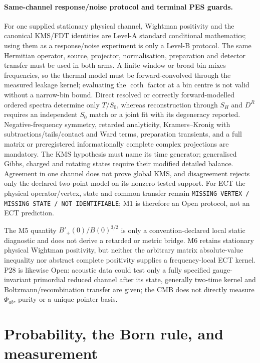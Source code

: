 \documentclass[11pt,a4paper]{article}
\begin{document}
\paragraph{Same-channel response/noise protocol and terminal PES guards.}
For one supplied stationary physical channel, Wightman positivity and the
canonical KMS/FDT identities are Level-A standard conditional mathematics;
using them as a response/noise experiment is only a Level-B protocol.  The
same Hermitian operator, source, projector, normalisation, preparation and
detector transfer must be used in both arms.  A finite window or broad bin
mixes frequencies, so the thermal model must be forward-convolved through
the measured leakage kernel; evaluating the $\coth$ factor at a bin centre is
not valid without a narrow-bin bound.  Direct resolved or correctly
forward-modelled ordered spectra determine only $T/S_0$, whereas reconstruction through $S_H$ and $D^R$ requires an
independent $S_0$ match or a joint fit with its degeneracy reported.
Negative-frequency symmetry, retarded analyticity, Kramers--Kronig with
subtractions/tails/contact and Ward terms, preparation transients, and a full
matrix or preregistered informationally complete complex projections are
mandatory.  The KMS hypothesis must name its time generator; generalised
Gibbs, charged and rotating states require their modified detailed balance.
Agreement in one channel does not prove global KMS, and disagreement rejects
only the declared two-point model on its nonzero tested support.  For ECT the
physical operator/vertex, state and common transfer remain
\texttt{MISSING VERTEX / MISSING STATE / NOT IDENTIFIABLE}; M1 is therefore
an Open protocol, not an ECT prediction.

The M5 quantity $B'_+(0)/B(0)^{3/2}$ is only a convention-declared local
static diagnostic and does not derive a retarded or metric bridge.  M6
retains stationary physical Wightman positivity, but neither the arbitrary
matrix absolute-value inequality nor abstract complete positivity supplies
a frequency-local ECT kernel.  P28 is likewise Open: acoustic data could test
only a fully specified gauge-invariant primordial reduced channel after its
state, generally two-time kernel and Boltzmann/recombination transfer are
given; the CMB does not directly measure $\Phi_{ab}$, purity or a unique
pointer basis.

\section{Probability, the Born rule, and measurement}
\end{document}
